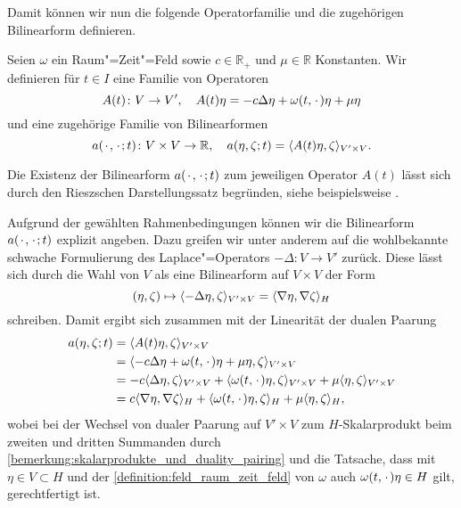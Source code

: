 \documentclass[../main.tex]{subfiles}
\begin{document}
Damit können wir nun die folgende Operatorfamilie und die zugehörigen Bilinearform definieren.

\begin{Definition}
\label{definition:operator_bilinearform_zeit}
    Seien $\omega$ ein Raum"=Zeit"=Feld sowie $c \in \mathbb{R}_{+}$ und $\mu \in \mathbb{R}$ Konstanten.
    Wir definieren für $t \in I$ eine Familie von Operatoren
    \begin{equation}
        \label{eq:operator_zeit}
        A(t) \colon V \to V', \quad  A(t) \eta = - c \Delta \eta + \omega(t, {\mkern2mu\cdot\mkern2mu}) \eta + \mu \eta
    \end{equation}
    und eine zugehörige Familie von Bilinearformen
    \begin{equation}
        \label{eq:bilinearform_zeit}
        a({\mkern2mu\cdot\mkern2mu}, {\mkern2mu\cdot\mkern2mu}; t) \colon V \times V \to \mathbb{R}, \quad  a(\eta, \zeta; t) = \langle A(t)\eta,\zeta\rangle_{V' \times V}.
    \end{equation}
\end{Definition}

\begin{Bemerkung}
\label{bemerkung:operator_bilinearform_riesz}
    Die Existenz der Bilinearform $a({\mkern2mu\cdot\mkern2mu}, {\mkern2mu\cdot\mkern2mu}; t)$ zum jeweiligen Operator $A(t)$ lässt sich durch den Rieszschen Darstellungssatz begründen, siehe beispielsweise \cite[Theorem \S{}22.1]{Halmos:1957vd}.
\end{Bemerkung}

Aufgrund der gewählten Rahmenbedingungen können wir die Bilinearform $a({\mkern2mu\cdot\mkern2mu}, {\mkern2mu\cdot\mkern2mu}; t)$ explizit angeben.
Dazu greifen wir unter anderem auf die wohlbekannte schwache Formulierung des Laplace"=Operators $- \Delta \colon V \to V'$ zurück.
Diese lässt sich durch die Wahl von $V$ als eine Bilinearform auf $V \times V$ der Form
\begin{equation}
    (\eta, \zeta) \mapsto \langle- \Delta \eta,\zeta\rangle_{V' \times V} = \langle\nabla \eta,\nabla \zeta\rangle_{H}
\end{equation}
schreiben.
Damit ergibt sich zusammen mit der Linearität der dualen Paarung
\begin{equation}
\label{eq:bilinearform_formel}
    \begin{aligned}
        a(\eta, \zeta; t)
            &= \langle A(t) \eta,\zeta\rangle_{V' \times V}
          \\&= \langle-c\Delta \eta + \omega(t, {\mkern2mu\cdot\mkern2mu}) \eta + \mu \eta,\zeta\rangle_{V' \times V}
          \\&= - c\langle\Delta \eta,\zeta\rangle_{V' \times V} + \langle\omega(t, {\mkern2mu\cdot\mkern2mu}) \eta,\zeta\rangle_{V' \times V} + \mu \langle\eta,\zeta\rangle_{V' \times V}
          \\&= c\langle\nabla \eta,\nabla \zeta\rangle_{H} + \langle\omega(t, {\mkern2mu\cdot\mkern2mu}) \eta,\zeta\rangle_{H} + \mu \langle\eta,\zeta\rangle_{H},
    \end{aligned}
\end{equation}
wobei bei der Wechsel von dualer Paarung auf $V' \times V$ zum $H$-Skalarprodukt beim zweiten und dritten Summanden durch \cref{bemerkung:skalarprodukte_und_duality_pairing} und die Tatsache, dass mit $\eta \in V \subset H$ und der \cref{definition:feld_raum_zeit_feld} von $\omega$ auch $\omega(t, {\mkern2mu\cdot\mkern2mu}) \eta \in H$ gilt, gerechtfertigt ist.
\end{document}
